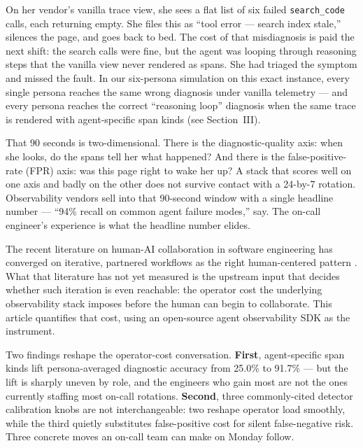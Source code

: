 \documentclass[journal]{IEEEtran}
\begin{document}
On her vendor's vanilla trace view, she sees a flat list of six failed \texttt{search\_code} calls, each returning empty. She files this as ``tool error --- search index stale,'' silences the page, and goes back to bed. The cost of that misdiagnosis is paid the next shift: the search calls were fine, but the agent was looping through reasoning steps that the vanilla view never rendered as spans. She had triaged the symptom and missed the fault. In our six-persona simulation on this exact instance, every single persona reaches the same wrong diagnosis under vanilla telemetry --- and every persona reaches the correct ``reasoning loop'' diagnosis when the same trace is rendered with agent-specific span kinds (see Section~III).

That 90 seconds is two-dimensional. There is the diagnostic-quality axis: when she looks, do the spans tell her what happened? And there is the false-positive-rate (FPR) axis: was this page right to wake her up? A stack that scores well on one axis and badly on the other does not survive contact with a 24-by-7 rotation. Observability vendors sell into that 90-second window with a single headline number --- ``94\% recall on common agent failure modes,'' say. The on-call engineer's experience is what the headline number elides.

The recent literature on human-AI collaboration in software engineering has converged on iterative, partnered workflows as the right human-centered pattern \cite{murphyhill2025,abrahao2025}. What that literature has not yet measured is the upstream input that decides whether such iteration is even reachable: the operator cost the underlying observability stack imposes before the human can begin to collaborate. This article quantifies that cost, using an open-source agent observability SDK \cite{aiware2026} as the instrument.

Two findings reshape the operator-cost conversation. \textbf{First}, agent-specific span kinds lift persona-averaged diagnostic accuracy from 25.0\% to 91.7\% --- but the lift is sharply uneven by role, and the engineers who gain most are not the ones currently staffing most on-call rotations. \textbf{Second}, three commonly-cited detector calibration knobs are not interchangeable: two reshape operator load smoothly, while the third quietly substitutes false-positive cost for silent false-negative risk. Three concrete moves an on-call team can make on Monday follow.

\end{document}
